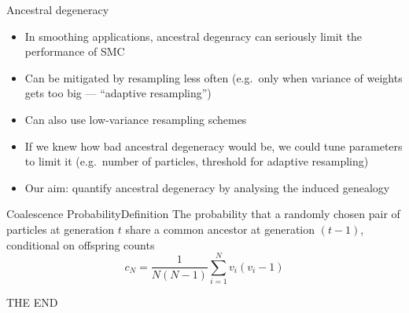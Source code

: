 \documentclass[aspectratio=169]{beamer}
\theoremstyle{definition}
\newcommand{\vt}[1]{v_{#1}}
\begin{document}
\begin{frame}{Ancestral degeneracy}
\begin{itemize}
\item In smoothing applications, ancestral degenracy can seriously limit the performance of SMC
\item Can be mitigated by resampling less often (e.g.\ only when variance of weights gets too big --- ``adaptive resampling'')
\item Can also use low-variance resampling schemes
\item If we knew how bad ancestral degeneracy would be, we could tune parameters to limit it (e.g.\ number of particles, threshold for adaptive resampling)
\item Our aim: quantify ancestral degeneracy by analysing the induced genealogy
\end{itemize}
\end{frame}


\begin{frame}{Coalescence Probability}{Definition}
The probability that a randomly chosen pair of particles at generation $t$ share a common ancestor at generation $(t-1)$, conditional on offspring counts
\begin{equation*}
c_N = \frac{1}{N(N-1)} \sum_{i=1}^N \vt{i}(\vt{i}-1)
\end{equation*}

\end{frame}


%
%


\begin{frame}
\centering
THE END
\end{frame}
\end{document}
